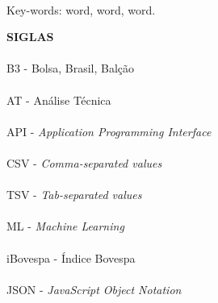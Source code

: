 \paragraph{}
\noindent Key-words: word, word, word.

\pagebreak


\begin{center}
\textbf{SIGLAS}
\end{center}
      \vspace{0.5cm}

\paragraph{}B3 - Bolsa, Brasil, Balção
\paragraph{}AT - Análise Técnica
\paragraph{}API - \textit{Application Programming Interface}
\paragraph{}CSV - \textit{Comma-separated values}
\paragraph{}TSV - \textit{Tab-separated values}
\paragraph{}ML - \textit{Machine Learning}
\paragraph{}iBovespa - Índice Bovespa
\paragraph{}JSON - \textit{JavaScript Object Notation}


\pagebreak